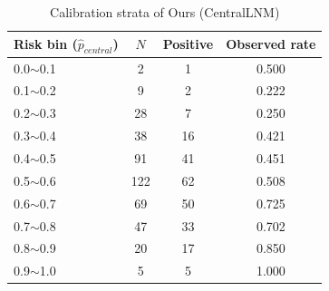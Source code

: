 \begin{table}[H]
\centering
\small
\caption{Calibration strata of Ours (CentralLNM)}
\label{tab:calib_strata}
\begin{tabular}{p{}ccc}
\toprule
Risk bin ($\hat{p}_{central}$) & $N$ & Positive & Observed rate \\
\midrule
0.0$\sim$0.1 & 2 & 1 & 0.500 \\
0.1$\sim$0.2 & 9 & 2 & 0.222 \\
0.2$\sim$0.3 & 28 & 7 & 0.250 \\
0.3$\sim$0.4 & 38 & 16 & 0.421 \\
0.4$\sim$0.5 & 91 & 41 & 0.451 \\
0.5$\sim$0.6 & 122 & 62 & 0.508 \\
0.6$\sim$0.7 & 69 & 50 & 0.725 \\
0.7$\sim$0.8 & 47 & 33 & 0.702 \\
0.8$\sim$0.9 & 20 & 17 & 0.850 \\
0.9$\sim$1.0 & 5 & 5 & 1.000 \\
\bottomrule
\end{tabular}
\end{table}
